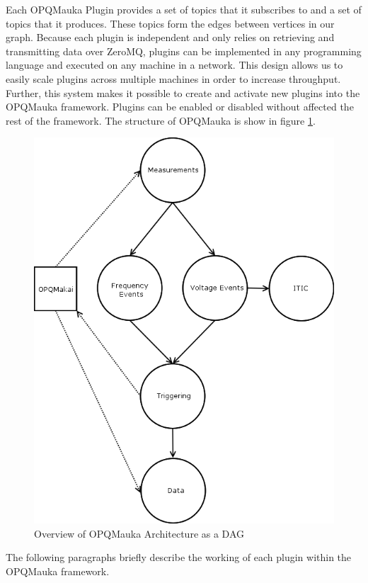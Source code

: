 \documentclass[a4paper, conference]{IEEEtran}
\begin{document}
Each OPQMauka Plugin provides a set of topics that it subscribes to and a set of topics that it produces. These topics form the edges between vertices in our graph. Because each plugin is independent and only relies on retrieving and transmitting data over ZeroMQ, plugins can be implemented in any programming language and executed on any machine in a network. This design allows us to easily scale plugins across multiple machines in order to increase throughput. Further, this system makes it possible to create and activate new plugins into the OPQMauka framework. Plugins can be enabled or disabled without affected the rest of the framework. The structure of OPQMauka is show in figure \ref{fig:opqmauka}.

\begin{figure}
	\includegraphics[width=1.0\linewidth]{img/opqmauka}
	\caption[OPQ Mauka DAG]{Overview of OPQMauka Architecture as a DAG}
	\label{fig:opqmauka}
\end{figure}

The following paragraphs briefly describe the working of each plugin within the OPQMauka framework.
\end{document}
